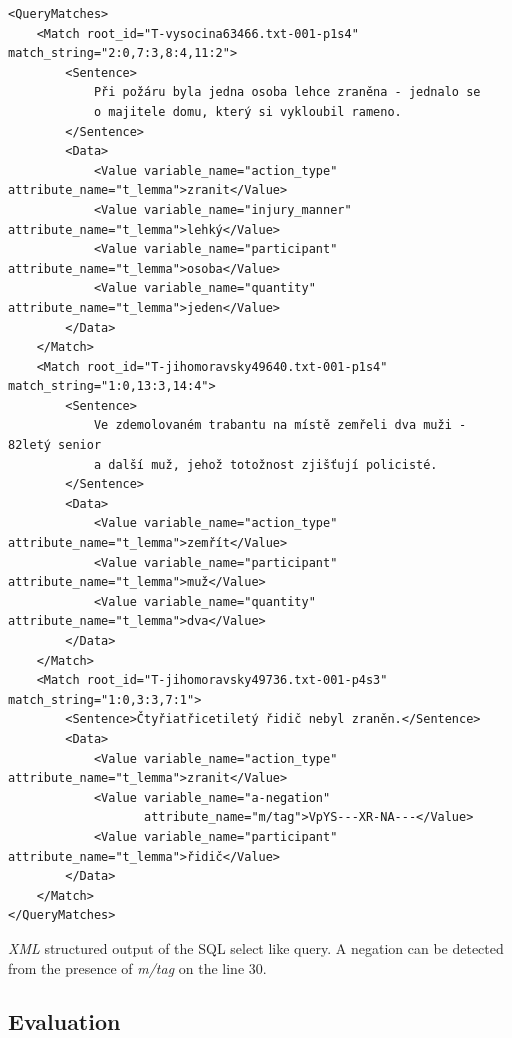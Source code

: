 \begin{listing}[ht]
\begin{verbatim}
<QueryMatches>
	<Match root_id="T-vysocina63466.txt-001-p1s4" match_string="2:0,7:3,8:4,11:2">
		<Sentence>
			Při požáru byla jedna osoba lehce zraněna - jednalo se
			o majitele domu, který si vykloubil rameno.
		</Sentence>
		<Data>
			<Value variable_name="action_type" attribute_name="t_lemma">zranit</Value>
			<Value variable_name="injury_manner" attribute_name="t_lemma">lehký</Value>
			<Value variable_name="participant" attribute_name="t_lemma">osoba</Value>
			<Value variable_name="quantity" attribute_name="t_lemma">jeden</Value>
		</Data>
	</Match>
	<Match root_id="T-jihomoravsky49640.txt-001-p1s4" match_string="1:0,13:3,14:4">
		<Sentence>
			Ve zdemolovaném trabantu na místě zemřeli dva muži - 82letý senior
			a další muž, jehož totožnost zjišťují policisté.
		</Sentence>
		<Data>
			<Value variable_name="action_type" attribute_name="t_lemma">zemřít</Value>
			<Value variable_name="participant" attribute_name="t_lemma">muž</Value>
			<Value variable_name="quantity" attribute_name="t_lemma">dva</Value>
		</Data>
	</Match>
	<Match root_id="T-jihomoravsky49736.txt-001-p4s3" match_string="1:0,3:3,7:1">
		<Sentence>Čtyřiatřicetiletý řidič nebyl zraněn.</Sentence>
		<Data>
			<Value variable_name="action_type" attribute_name="t_lemma">zranit</Value>
			<Value variable_name="a-negation" 
			       attribute_name="m/tag">VpYS---XR-NA---</Value>
			<Value variable_name="participant" attribute_name="t_lemma">řidič</Value>
		</Data>
	</Match>
</QueryMatches>
\end{verbatim}
\caption{\emph{XML} structured output of the SQL select like query. A negation can be detected from the presence of \emph{m/tag} on the line 30.}
\label{lst:select_xml}
\end{listing}







\clearpage

\subsection{Evaluation}




